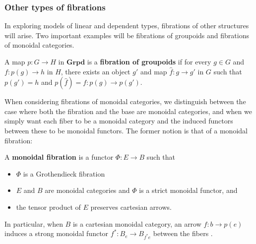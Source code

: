 \subsubsection{Other types of fibrations}
In exploring models of linear and dependent types, fibrations of other structures will arise. Two important examples will be fibrations of groupoids and fibrations of monoidal categories.
\begin{defn}
A map $p : G \to H$ in $\textbf{Grpd}$ is a \textbf{fibration of groupoids} if for every $g \in G$
and $f : p(g) \to h$ in $H$, there exists an object $g'$ and map $\hat f : g \to g'$ in $G$ such that $p(g') = h$ and $p(\hat f) = f : p(g) \to p(g')$.
\end{defn}
When considering fibrations of monoidal categories, we distinguish between the case where both the fibration and the base are monoidal categories, and when we simply want each fiber to be a monoidal category and the induced functors between these to be monoidal functors. The former notion is that of a monoidal fibration:
\begin{defn}
A \textbf{monoidal fibration} is a functor $\Phi\colon E\to B$ such that
\begin{itemize}
\item $\Phi$ is a Grothendieck fibration
\item $E$ and $B$ are monoidal categories and $\Phi$ is a strict monoidal functor, and
\item the tensor product of $E$ preserves cartesian arrows.
\end{itemize}
\end{defn}
In particular, when $B$ is a cartesian monoidal category, an arrow $f : b \to p(e)$ induces a strong monoidal functor $f^* : B_e \to B_{f^*e}$ between the fibers \cite{shulmanmonoidal}.


